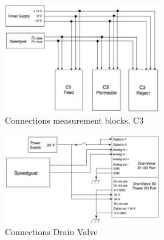\newpage

\begin{figure}[h]
    \centering
    \includegraphics[width=0.6\textwidth]{C3Conn}
    \caption{Connections measurement blocks, C3}
    \label{fig:C3Conn}
\end{figure}

\begin{figure}[h]
    \centering
    \includegraphics[width=0.6\textwidth]{ValveConn}
    \caption{Connections Drain Valve}
    \label{fig:ValveConn}
\end{figure}

\newpage

